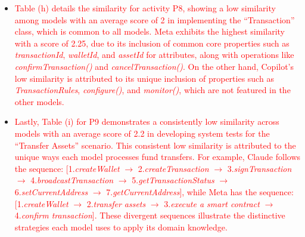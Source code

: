 \begin{itemize}
	\item \textcolor{red}{Table (h) details the similarity for activity P8, showing a low similarity among models with an average score of 2 in implementing the ``Transaction'' class, which is common to all models. Meta exhibits the highest similarity with a score of 2.25, due to its inclusion of common core properties such as {\em transactionId}, {\em walletId}, and {\em assetId} for attributes, along with operations like {\em confirmTransaction()} and {\em cancelTransaction()}. On the other hand, Copilot's low similarity is attributed to its unique inclusion of properties such as {\em TransactionRules}, {\em configure()}, and {\em monitor()}, which are not featured in the other models.}
	
	\item \textcolor{red}{Lastly, Table (i) for P9 demonstrates a consistently low similarity across models with an average score of 2.2 in developing system tests for the ``Transfer Assets'' scenario. This consistent low similarity is attributed to the unique ways each model processes fund transfers. For example, Claude follows the sequence: [1.\emph{create\-Wallet} $\rightarrow$ 2.\emph{create\-Transaction} $\rightarrow$ 3.\emph{sign\-Transaction} $\rightarrow$ 4.\emph{broadcast\-Transaction} $\rightarrow$ 5.\emph{get\-Transaction\-Status} $\rightarrow$ 6.\emph{set\-Current\-Address} $\rightarrow$ 7.\emph{get\-Current\-Address}], while Meta has the sequence: [1.\emph{create\-Wallet} $\rightarrow$ 2.\emph{transfer assets} $\rightarrow$ 3.\emph{execute a smart contract} $\rightarrow$ 4.\emph{confirm transaction}]. These divergent sequences illustrate the distinctive strategies each model uses to apply its domain knowledge.}
\end{itemize}
